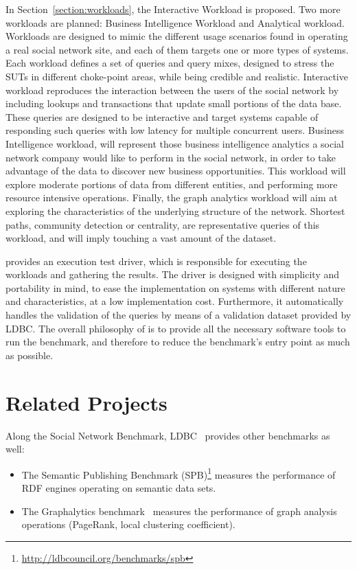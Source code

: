 In Section~\ref{section:workloads}, the Interactive Workload is proposed.
Two more workloads are planned:  Business Intelligence Workload and
Analytical workload. Workloads are designed to mimic the different usage
scenarios found in operating a real social network site, and each of them
targets one or more types of systems.  Each workload defines a set of queries
and query mixes, designed to stress the SUTs in different choke-point areas,
while being credible and realistic. Interactive workload reproduces the
interaction between the users of the social network by including lookups and
transactions that update small portions of the data base.  These queries are
designed to be interactive and target systems capable of responding such
queries with low latency for multiple concurrent users. Business Intelligence
workload, will represent those business intelligence analytics a social
network company would like to perform in the social network, in order to take
advantage of the data to discover new business opportunities. This workload
will explore moderate portions of data from different entities, and performing more
resource intensive operations. Finally, the graph analytics workload will aim at
exploring the characteristics of the underlying structure of the network. Shortest
paths, community detection or centrality, are representative queries of this workload,
and will imply touching a vast amount of the dataset.


\ldbcsnb provides an execution test driver, which is responsible for executing
the workloads and gathering the results. The driver is designed with simplicity
and portability in mind, to ease the implementation on systems with different
nature and characteristics, at a low implementation cost. Furthermore, it
automatically handles the validation of the queries by means of a validation
dataset provided by LDBC.  The overall philosophy of \ldbcsnb is to provide all
the necessary software tools to run the benchmark, and therefore to reduce the
benchmark's entry point as much as possible.

\section{Related Projects}

Along the Social Network Benchmark, LDBC~\cite{DBLP:journals/sigmod/AnglesBLF0ENMKT14} provides other benchmarks as well:

\begin{itemize}
	\item The Semantic Publishing Benchmark (SPB)\footnote{\url{http://ldbcouncil.org/benchmarks/spb}} measures the performance of RDF engines operating on semantic data sets.
	\item The Graphalytics benchmark~\cite{DBLP:journals/pvldb/IosupHNHPMCCSAT16} measures the performance of graph analysis operations (\eg PageRank, local clustering coefficient).
\end{itemize}

